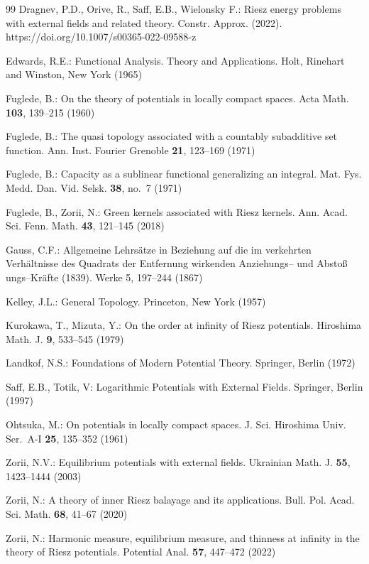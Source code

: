 \documentclass[12pt,a4paper,reqno]{amsart} %
\theoremstyle{lause}
\theoremstyle{maaritelma}
\theoremstyle{lause}
\theoremstyle{maaritelma}
\numberwithin{equation}{section}
\begin{document}
\begin{thebibliography}{99}
 Dragnev, P.D., Orive, R., Saff, E.B., Wielonsky F.: Riesz energy problems with external fields and related theory.
Constr. Approx. (2022). https://doi.org/10.1007/s00365-022-09588-z

Edwards, R.E.: Functional Analysis. Theory and Applications. Holt,
Rinehart and Winston, New York (1965)

 Fuglede, B.: On the theory of potentials in locally compact spaces. Acta Math. {\bf 103}, 139--215  (1960)

 Fuglede, B.: The quasi topology associated with a countably subadditive set function. Ann. Inst. Fourier Grenoble {\bf 21}, 123--169 (1971)

 Fuglede, B.: Capacity as a sublinear functional generalizing an integral. Mat. Fys. Medd. Dan. Vid. Selsk. {\bf 38}, no.~7 (1971)

 Fuglede, B., Zorii, N.: Green kernels associated with Riesz kernels. Ann. Acad. Sci. Fenn. Math. {\bf 43}, 121--145 (2018)

Gauss, C.F.: Allgemeine Lehrs\"atze in Beziehung auf die im verkehrten Verh\"altnisse des
  Quadrats der Entfernung wirkenden Anziehungs-- und Absto\ss
  ungs--Kr\"afte (1839). Werke 5, 197--244 (1867)

Kelley, J.L.: General Topology. Princeton, New York (1957)

 Kurokawa, T., Mizuta, Y.: On the order at infinity of Riesz potentials. Hiroshima Math. J. {\bf 9}, 533--545 (1979)

 Landkof, N.S.: Foundations of Modern Potential Theory. Springer, Berlin (1972)

 Saff, E.B., Totik, V: Logarithmic Potentials with External Fields. Springer, Berlin (1997)

 Ohtsuka, M.: On potentials in locally compact spaces. J. Sci. Hiroshima Univ. Ser.\ A-I {\bf 25}, 135--352 (1961)

 Zorii, N.V.: Equilibrium potentials with external fields. Ukrainian Math. J. {\bf 55},
1423--1444 (2003)

 Zorii, N.: A theory of inner Riesz balayage and its applications. Bull. Pol. Acad. Sci. Math. {\bf 68}, 41--67 (2020)

 Zorii, N.: Harmonic measure, equilibrium measure, and thinness at infinity in the theory of Riesz potentials. Potential Anal. {\bf 57}, 447--472 (2022)


\end{thebibliography}
\end{document}
